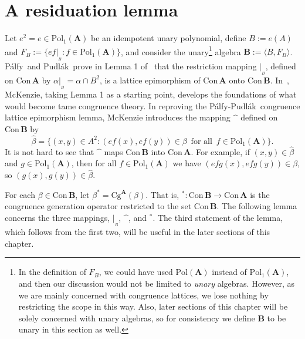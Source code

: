 \documentclass[cm,dissertation,actual,final]{uhthesis}
\theoremstyle{plain}
\theoremstyle{definition}
\theoremstyle{remark}
\numberwithin{theorem}{section}
\numberwithin{claim}{chapter}
\numberwithin{equation}{section}
\numberwithin{conjecture}{chapter}
\newcommand{\PP}{P\'alfy-Pudl\'ak}
\newcommand{\PAP}{P\'alfy\ and Pudl\'ak}
\newcommand{\<}{\ensuremath{\langle}}
\renewcommand{\>}{\ensuremath{\rangle}}
\newcommand{\Cg}{\ensuremath{\mathrm{Cg}}}
\newcommand{\Con}{\ensuremath{\mathrm{Con\,}}}
\newcommand{\Pol}{\ensuremath{\mathrm{Pol}}}
\newcommand{\0}{\ensuremath{\mathbf{0}}}
\newcommand{\1}{\ensuremath{\mathbf{1}}}
\newcommand{\2}{\ensuremath{\mathbf{2}}}
\newcommand{\3}{\ensuremath{\mathbf{3}}}
\newcommand{\4}{\ensuremath{\mathbf{4}}}
\newcommand{\5}{\ensuremath{\mathbf{5}}}
\newcommand{\bA}{\ensuremath{\mathbf{A}}}
\newcommand{\bB}{\ensuremath{\mathbf{B}}}
\newcommand{\resB}{\ensuremath{|_{_B}}}
\newcommand{\hatmap}{\ensuremath{\widehat{\phantom{x}}}}
\begin{document}
\section{A residuation lemma}
\label{sec:residuation-lemma}

Let $e^2 = e \in \Pol_1(\bA)$ be an idempotent unary polynomial, define
$B:=e(A)$ and
$F_B := \{ef\resB : f\in \Pol_1(\bA)\}$, and consider the 
unary\footnote{In the definition of  $F_B$, we could have used 
  $\Pol(\bA)$ instead of $\Pol_1(\bA)$, and then our discussion would not be
  limited to \emph{unary} algebras.  However, as we are mainly concerned with
  congruence lattices, we lose nothing by restricting the scope in this way.  Also, 
  later sections of this chapter will be solely concerned with unary algebras, so
  for consistency we define $\bB$ to be unary in this section as well.} 
algebra $\bB:= \<B, F_B\>$.  \PAP\
prove in Lemma 1 of~\cite{Palfy:1980} that
the restriction mapping $\resB$, defined on $\Con\bA$ by 
$\alpha\resB = \alpha \cap B^2$, is a lattice epimorphism of $\Con\bA$ onto $\Con\bB$.
In~\cite{McKenzie:1983}, McKenzie, taking Lemma 1 as a starting point,
develops the foundations of what would become tame congruence theory.  
In reproving the \PP\ congruence lattice epimorphism lemma,
%
McKenzie introduces the mapping $\hatmap$ defined on $\Con\bB$ by 
\[
\widehat{\beta} = \{(x,y) \in A^2 : (ef(x), ef(y))\in \beta\, \text{ for all }\, f\in \Pol_1(\bA) \}.
\]
It is not hard to see that $\hatmap$ maps $\Con\bB$ into $\Con\bA$.  For
example, if $(x,y) \in \widehat{\beta}$ and $g\in \Pol_1(\bA)$, then for all $f\in \Pol_1(\bA)$ we
have $(efg(x),efg(y)) \in \beta$, so $(g(x),g(y))\in \widehat{\beta}$.

For each $\beta \in \Con\bB$, let $\beta^* = \Cg^\bA(\beta)$.  That is,
$^*: \Con\bB \rightarrow \Con\bA$ is
the congruence generation operator restricted to the set $\Con\bB$.
The following lemma concerns the three mappings, $\resB$, $\hatmap$, and $^*$.
The third statement of the lemma, which follows from the first two, 
will be useful in the later sections of this chapter.
\end{document}

